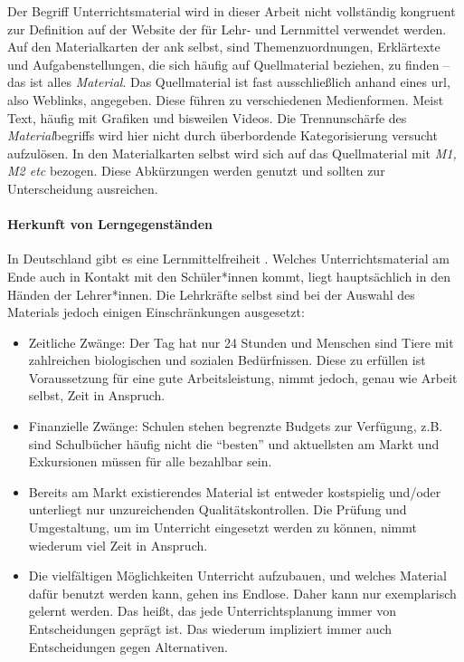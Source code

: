 Der Begriff Unterrichtsmaterial wird in dieser Arbeit nicht vollständig kongruent zur Definition auf der Website der \textcite{KMKMittel} für Lehr- und Lernmittel verwendet werden. Auf den Materialkarten der \gls{ank} selbst, sind Themenzuordnungen, Erklärtexte und Aufgabenstellungen, die sich häufig auf Quellmaterial beziehen, zu finden -- das ist alles \emph{Material}. Das Quellmaterial ist fast ausschließlich anhand eines \gls{url}, also Weblinks, angegeben. Diese führen zu verschiedenen Medienformen. Meist Text, häufig mit Grafiken und bisweilen Videos. Die Trennunschärfe des \emph{Material}begriffs wird hier nicht durch überbordende Kategorisierung versucht aufzulösen. In den Materialkarten selbst wird sich auf das Quellmaterial mit \emph{M1, M2 \gls{etc}} bezogen. Diese Abkürzungen werden genutzt und sollten zur Unterscheidung ausreichen. 


\paragraph{Herkunft von Lerngegenständen} 
In Deutschland gibt es eine Lernmittelfreiheit \autocite[]{KMKMittel}.
Welches Unterrichtsmaterial am Ende auch in Kontakt mit den Schüler*innen kommt, liegt hauptsächlich in den Händen der Lehrer*innen.
Die Lehrkräfte selbst sind bei der Auswahl des Materials jedoch einigen Einschränkungen ausgesetzt:
\begin{itemize}
    \item Zeitliche Zwänge: Der Tag hat nur 24 Stunden und Menschen sind Tiere mit zahlreichen biologischen und sozialen Bedürfnissen. Diese zu erfüllen ist Voraussetzung für eine gute Arbeitsleistung, nimmt jedoch, genau wie Arbeit selbst, Zeit in Anspruch. 
    \item Finanzielle Zwänge: Schulen stehen begrenzte Budgets zur Verfügung, z.B. sind Schulbücher häufig nicht die \enquote{besten} und aktuellsten am Markt und Exkursionen müssen für alle bezahlbar sein. 
    \item Bereits am Markt existierendes Material ist entweder kostspielig und/oder unterliegt nur unzureichenden Qualitätskontrollen. Die Prüfung und Umgestaltung, um im Unterricht eingesetzt werden zu können, nimmt wiederum viel Zeit in Anspruch. 
    \item Die vielfältigen Möglichkeiten Unterricht aufzubauen, und welches Material dafür benutzt werden kann, gehen ins Endlose. Daher kann nur exemplarisch gelernt werden. Das heißt, das jede Unterrichtsplanung immer von Entscheidungen geprägt ist. Das wiederum impliziert immer auch Entscheidungen gegen Alternativen.
\end{itemize}


